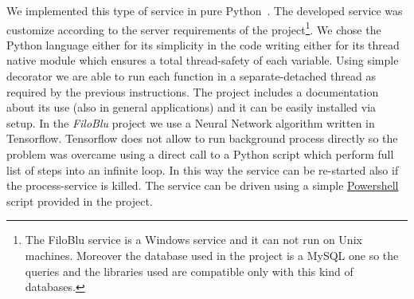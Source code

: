 \documentclass{standalone}
\begin{document}
We implemented this type of service in pure Python~\cite{FiloBlu}.
The developed service was customize according to the server requirements of the project\footnote{
  The FiloBlu service is a Windows service and it can not run on Unix machines.
  Moreover the database used in the project is a MySQL one so the queries and the libraries used are compatible only with this kind of databases.
}.
We chose the Python language either for its simplicity in the code writing either for its thread native module which ensures a total thread-safety of each variable.
Using simple decorator we are able to run each function in a separate-detached thread as required by the previous instructions.
The project includes a documentation about its use (also in general applications) and it can be easily installed via \textsf{setup}.
In the \emph{FiloBlu} project we use a Neural Network algorithm written in \textsf{Tensorflow}.
\textsf{Tensorflow} does not allow to run background process directly so the problem was overcame using a direct call to a Python script which perform full list of steps into an infinite loop.
In this way the service can be re-started also if the process-service is killed.
The service can be driven using a simple \href{https://github.com/Nico-Curti/FiloBluService/blob/master/filobluservice.ps1}{\textsf{Powershell}} script provided in the project.
\end{document}
